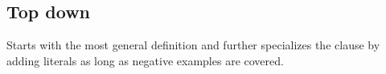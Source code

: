 \documentclass[12pt, oneside]{report}
\numberwithin{definition}{chapter}
\numberwithin{theorem}{chapter}
\numberwithin{lemma}{chapter}
\numberwithin{Rule}{chapter}
\numberwithin{equation}{chapter}
\begin{document}
\subsection{Top down}
Starts with the most general definition and further specializes the clause by adding literals as long as negative examples are covered.


%


\end{document}
